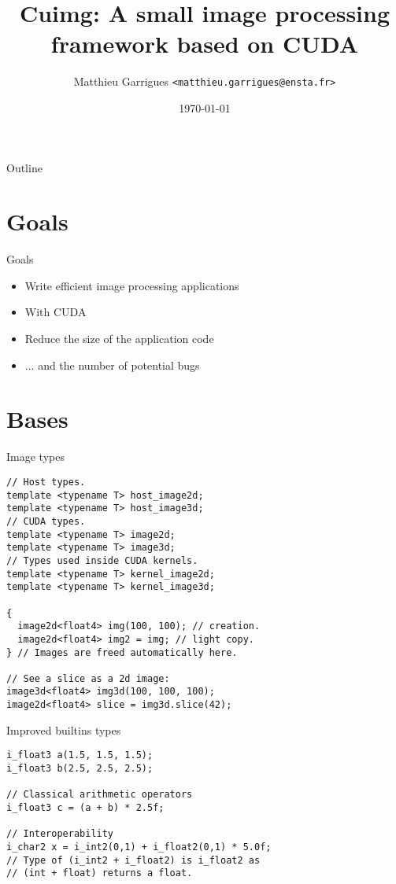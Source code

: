 \documentclass{beamer}
\title{Cuimg: A small image processing framework based on CUDA}
\author[Matthieu Garrigues]{Matthieu Garrigues  \texttt{<matthieu.garrigues@ensta.fr>}}
\date{\today}
\begin{document}
\begin{frame}
\maketitle
\end{frame}


\begin{frame}{Outline}
  \tableofcontents
\end{frame}

\section{Goals}

\begin{frame}{Goals}
  \begin{itemize}
  \item Write efficient image processing applications
  \item With CUDA
  \item Reduce the size of the application code
  \item ... and the number of potential bugs
  \end{itemize}
\end{frame}

\section{Bases}

\begin{frame}[containsverbatim]{Image types}
\begin{lstlisting}
// Host types.
template <typename T> host_image2d;
template <typename T> host_image3d;
// CUDA types.
template <typename T> image2d;
template <typename T> image3d;
// Types used inside CUDA kernels.
template <typename T> kernel_image2d;
template <typename T> kernel_image3d;

{
  image2d<float4> img(100, 100); // creation.
  image2d<float4> img2 = img; // light copy.
} // Images are freed automatically here.

// See a slice as a 2d image:
image3d<float4> img3d(100, 100, 100);
image2d<float4> slice = img3d.slice(42);
\end{lstlisting}
\end{frame}

\begin{frame}[containsverbatim]{Improved builtins types}
\begin{lstlisting}
i_float3 a(1.5, 1.5, 1.5);
i_float3 b(2.5, 2.5, 2.5);

// Classical arithmetic operators
i_float3 c = (a + b) * 2.5f;

// Interoperability
i_char2 x = i_int2(0,1) + i_float2(0,1) * 5.0f;
// Type of (i_int2 + i_float2) is i_float2 as
// (int + float) returns a float.
\end{lstlisting}
\end{frame}
\end{document}
